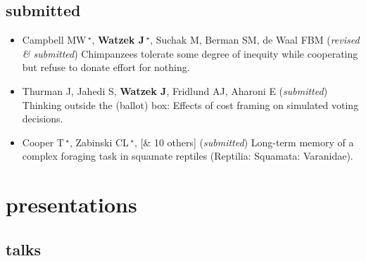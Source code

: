 \documentclass[]{friggeri-cv}
\begin{document}

\subsection{submitted}

\begin{itemize}[align=center]
  \item Campbell MW\,{\Large${}^\star$}, \textbf{Watzek J\,{\Large${}^\star$}}, Suchak M, Berman SM, de Waal FBM (\emph{revised \& submitted}) Chimpanzees tolerate some degree of inequity while cooperating but refuse to donate effort for nothing.
  \item Thurman J, Jahedi S, \textbf{Watzek J}, Fridlund AJ, Aharoni E (\emph{submitted}) Thinking outside the (ballot) box: Effects of cost framing on simulated voting decisions.
  \item Cooper T\,{\Large${}^\star$}, Zabinski CL\,{\Large${}^\star$}, [\& 10 others] (\emph{submitted}) Long-term memory of a complex foraging task in squamate reptiles (Reptilia: Squamata: Varanidae).
\end{itemize}


\section{presentations}


\subsection{talks}
\end{document}
